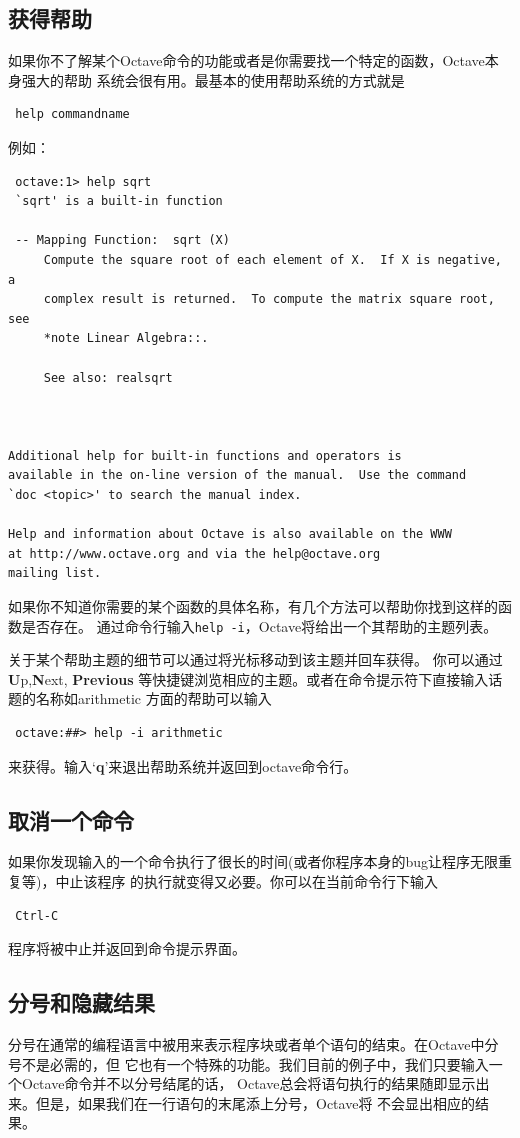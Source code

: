 \documentclass[UTF8,adobefonts]{ctexart}
\begin{document}
\subsection{获得帮助}
如果你不了解某个Octave命令的功能或者是你需要找一个特定的函数，Octave本身强大的帮助
系统会很有用。最基本的使用帮助系统的方式就是
\begin{verbatim}
 help commandname
\end{verbatim}
例如：
\begin{verbatim}
 octave:1> help sqrt
 `sqrt' is a built-in function

 -- Mapping Function:  sqrt (X)
     Compute the square root of each element of X.  If X is negative, a
     complex result is returned.  To compute the matrix square root, see
     *note Linear Algebra::.

     See also: realsqrt



Additional help for built-in functions and operators is
available in the on-line version of the manual.  Use the command
`doc <topic>' to search the manual index.

Help and information about Octave is also available on the WWW
at http://www.octave.org and via the help@octave.org
mailing list.

\end{verbatim}
如果你不知道你需要的某个函数的具体名称，有几个方法可以帮助你找到这样的函数是否存在。
通过命令行输入{\tt help -i}，Octave将给出一个其帮助的主题列表。

关于某个帮助主题的细节可以通过将光标移动到该主题并回车获得。 你可以通过{\bf U}p,{\bf N}ext,
{\bf Previous} 等快捷键浏览相应的主题。或者在命令提示符下直接输入话题的名称如arithmetic
方面的帮助可以输入
\begin{verbatim}
 octave:##> help -i arithmetic
\end{verbatim}
来获得。输入‘{\bf q}’来退出帮助系统并返回到octave命令行。
\subsection{取消一个命令}
如果你发现输入的一个命令执行了很长的时间(或者你程序本身的bug让程序无限重复等)，中止该程序
的执行就变得又必要。你可以在当前命令行下输入
\begin{verbatim}
 Ctrl-C
\end{verbatim}
程序将被中止并返回到命令提示界面。
\subsection{分号和隐藏结果}
分号在通常的编程语言中被用来表示程序块或者单个语句的结束。在Octave中分号不是必需的，但
它也有一个特殊的功能。我们目前的例子中，我们只要输入一个Octave命令并不以分号结尾的话，
Octave总会将语句执行的结果随即显示出来。但是，如果我们在一行语句的末尾添上分号，Octave将
不会显出相应的结果。
\end{document}
